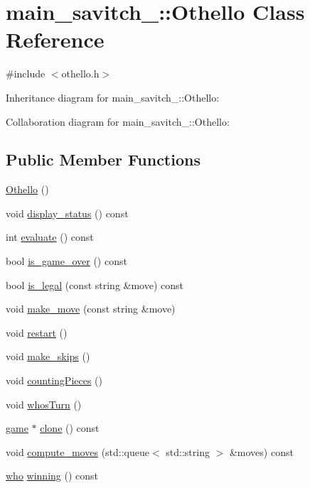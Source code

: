 \hypertarget{classmain__savitch__14_1_1_othello}{}\section{main\+\_\+savitch\+\_\+:\+:Othello Class Reference}
\label{classmain__savitch__14_1_1_othello}


{\ttfamily \#include $<$othello.\+h$>$}



Inheritance diagram for main\+\_\+savitch\+\_\+:\+:Othello\+:


Collaboration diagram for main\+\_\+savitch\+\_\+:\+:Othello\+:
\subsection*{Public Member Functions}
\begin{DoxyCompactItemize}
\item 
\hyperlink{classmain__savitch__14_1_1_othello_a240d83489f3c1a1148c4424612d9679a}{Othello} ()
\item 
void \hyperlink{classmain__savitch__14_1_1_othello_a471f0e8f0e63ed32d764682f60110267}{display\+\_\+status} () const 
\item 
int \hyperlink{classmain__savitch__14_1_1_othello_a1b3239a14882cbc7e7bd44c0b6828514}{evaluate} () const 
\item 
bool \hyperlink{classmain__savitch__14_1_1_othello_a4387d20f953aab54025760ec3f72f7ca}{is\+\_\+game\+\_\+over} () const 
\item 
bool \hyperlink{classmain__savitch__14_1_1_othello_ab4fb0040d5e1dbe34c33fa11a82285cf}{is\+\_\+legal} (const string \&move) const 
\item 
void \hyperlink{classmain__savitch__14_1_1_othello_a1066b280efa5cb41039585669282fe06}{make\+\_\+move} (const string \&move)
\item 
void \hyperlink{classmain__savitch__14_1_1_othello_abf872b8074bfa4c04119317dc3b39af2}{restart} ()
\item 
void \hyperlink{classmain__savitch__14_1_1_othello_a3177234195a490eef52343d957e64b5d}{make\+\_\+skips} ()
\item 
void \hyperlink{classmain__savitch__14_1_1_othello_a19f49edfbe82b84922877e00bc854ed8}{counting\+Pieces} ()
\item 
void \hyperlink{classmain__savitch__14_1_1_othello_a21440dbb4511812a76c578a5f546710b}{whos\+Turn} ()
\item 
\hyperlink{classmain__savitch__14_1_1game}{game} $\ast$ \hyperlink{classmain__savitch__14_1_1_othello_ab5a505f8a6ffd860376bf074c57e8a5f}{clone} () const 
\item 
void \hyperlink{classmain__savitch__14_1_1_othello_aae15562565348c574b8e4c0b7782d19f}{compute\+\_\+moves} (std\+::queue$<$ std\+::string $>$ \&moves) const 
\item 
\hyperlink{classmain__savitch__14_1_1game_a4fe20fb287f809ae2b68e28e4ccba634}{who} \hyperlink{classmain__savitch__14_1_1_othello_a8934d1b63f73c03dae9629dbe03955d7}{winning} () const 
\end{DoxyCompactItemize}
